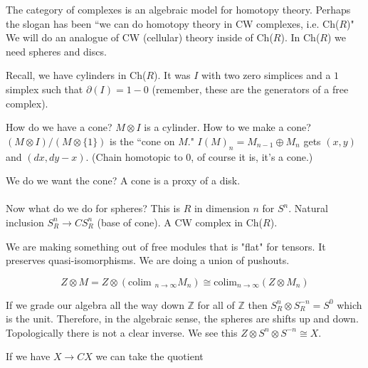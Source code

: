 \documentclass[12pt]{article}
\theoremstyle{definition}
\begin{document}
	The category of complexes is an algebraic model for homotopy theory. Perhaps the slogan has been ``we can do homotopy theory in CW complexes, i.e. Ch($R$)" We will do an analogue of CW (cellular) theory inside of Ch($R$). In Ch($R$) we need spheres and discs. 
	
	Recall, we have cylinders in Ch($R$). It was $I$ with two zero simplices and a $1$ simplex such that $\partial(I)={1}-{0}$ (remember, these are the generators of a free complex). 
	
	How do we have a cone? $M\otimes I$ is a cylinder. How to we make a cone? $(M\otimes I)/(M\otimes \{1\})$ is the ``cone on $M$." $I(M)_n=M_{n-1}\oplus M_n$ gets $(x,y)$ and $(dx,dy-x)$. (Chain homotopic to $0$, of course it is, it's a cone.)
	
	We do we want the cone? A cone is a proxy of a disk. 
	\\\\
	Now what do we do for spheres? This is $R$ in dimension $n$ for $S^n$.  Natural inclusion $S_R^n \to CS_R^n$ (base of cone). A CW complex in Ch($R$).
	\begin{center}
	\end{center}
	We are making something out of free modules that is "flat" for tensors. It preserves quasi-isomorphisms. We are doing a union of pushouts. 
	
	\[Z\otimes M=Z\otimes (\text{colim }_{n\to\infty} M_n)\cong \text{colim}_{n\to\infty}(Z\otimes M_n)\]
	
	If we grade our algebra all the way down $\mathbb{Z}$ for all of $\mathbb{Z}$ then $S_R^{n}\otimes S_R^{-n}=S^0$ which is the unit. Therefore, in the algebraic sense, the spheres are shifts up and down. Topologically there is not a clear inverse. We see this $Z\otimes S^n\otimes S^{-n}\cong X$. 
	
	If we have $X\to CX$ we can take the quotient \begin{center}
		\\
	\end{center}
	
\end{document}
